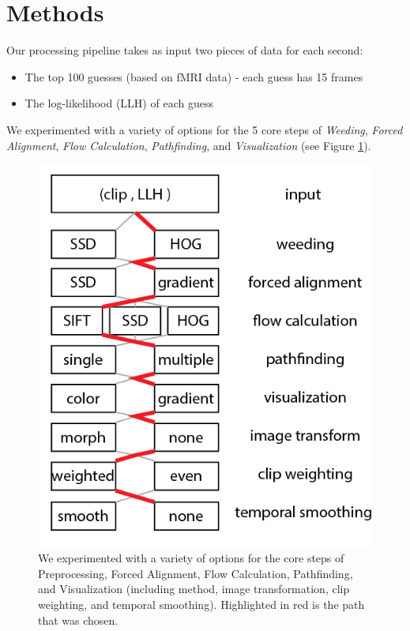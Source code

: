 
\section{Methods}

Our processing pipeline takes as input two pieces of data for each second:

\begin{itemize}
\item The top 100 guesses (based on fMRI data) - each guess has 15 frames
\item The log-likelihood (LLH) of each guess
\end{itemize}

We experimented with a variety of options for the 5 core steps of \emph{Weeding}, \emph{Forced Alignment}, \emph{Flow Calculation}, \emph{Pathfinding}, and \emph{Visualization} (see Figure \ref{fig:system}).

\begin{figure}
\centering
    \includegraphics[width=1.0\columnwidth]{figures/system.png}
\caption{We experimented with a variety of options for the core steps of Preprocessing, Forced Alignment, Flow Calculation, Pathfinding, and Visualization (including method, image transformation, clip weighting, and temporal smoothing).  Highlighted in red is the path that was chosen.}
\label{fig:system}
\end{figure}

